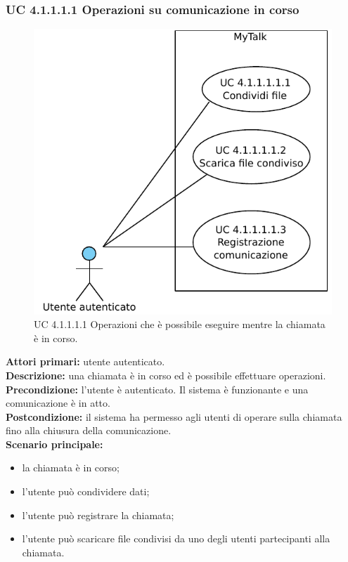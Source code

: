 \newpage

\subsubsection{UC 4.1.1.1.1 Operazioni su comunicazione in corso}

\begin{figure}[htbp]
\centering
\includegraphics[scale=0.7]{./casi_uso/UC4-1-1-1-1.pdf}
\caption{UC 4.1.1.1.1 Operazioni che è possibile eseguire mentre la chiamata è in corso.}
\end{figure}

\noindent
\textbf{Attori primari:} utente autenticato.\\
\textbf{Descrizione:} una chiamata è in corso ed è possibile effettuare operazioni.\\
\textbf{Precondizione:} l'utente è autenticato. Il sistema è funzionante e una comunicazione è in atto.\\
\textbf{Postcondizione:} il sistema ha permesso agli utenti di operare sulla chiamata fino alla chiusura della comunicazione.\\
\textbf{Scenario principale:}
\begin{itemize}
\item la chiamata è in corso;
\item l'utente può condividere dati;
\item l'utente può registrare la chiamata;
\item l'utente può scaricare file condivisi da uno degli utenti partecipanti alla chiamata.
\end{itemize}

